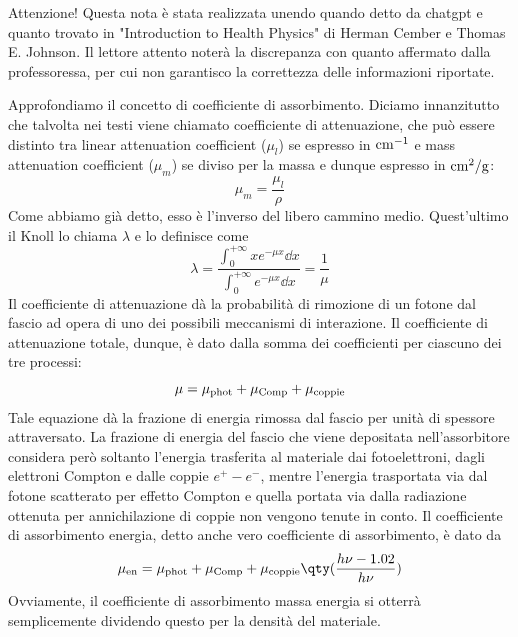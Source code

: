 \begin{approfondimento}
    \footnotesize Attenzione! Questa nota è stata realizzata unendo quando detto da chatgpt e quanto trovato in "Introduction to Health Physics" di Herman Cember e Thomas E. Johnson. Il lettore attento noterà la discrepanza con quanto affermato dalla professoressa, per cui non garantisco la correttezza delle informazioni riportate.
    
    Approfondiamo il concetto di coefficiente di assorbimento. Diciamo innanzitutto che talvolta nei testi viene chiamato coefficiente di attenuazione, che può essere distinto tra linear attenuation coefficient ($\mu_l$) se espresso in $\rm cm^{-1}$ e mass attenuation coefficient ($\mu_m$) se diviso per la massa e dunque espresso in $\rm cm^2/g$:
    \begin{equation*}
        \mu_{m}=\frac{\mu_l}{\rho}
    \end{equation*}
    Come abbiamo già detto, esso è l'inverso del libero cammino medio. Quest'ultimo il Knoll lo chiama $\lambda$ e lo definisce come
    \begin{equation*}
        \lambda
        =\frac{\int_{0}^{+\infty} xe^{-\mu x} \dd{x}}{\int_{0}^{+\infty} e^{-\mu x} \dd{x}}
        =\frac{1}{\mu}
    \end{equation*}
    Il coefficiente di attenuazione dà la probabilità di rimozione di un fotone dal fascio ad opera di uno dei possibili meccanismi di interazione. Il coefficiente di attenuazione totale, dunque, è dato dalla somma dei coefficienti per ciascuno dei tre processi:
    \begin{equation*}
        \mu=\mu_{\rm phot} + \mu_{\rm Comp} + \mu_{\rm coppie}
    \end{equation*}
    Tale equazione dà la frazione di energia rimossa dal fascio per unità di spessore attraversato. La frazione di energia del fascio che viene depositata nell'assorbitore considera però soltanto l'energia trasferita al materiale dai fotoelettroni, dagli elettroni Compton e dalle coppie $e^+ - e^-$, mentre l'energia trasportata via dal fotone scatterato per effetto Compton e quella portata via dalla radiazione ottenuta per annichilazione di coppie non vengono tenute in conto. Il coefficiente di assorbimento energia, detto anche vero coefficiente di assorbimento, è dato da
    \begin{equation*}
        \mu_{\rm en}
        =\mu_{\rm phot} + \mu_{\rm Comp} + \mu_{\rm coppie} \qty( \frac{h \nu - 1.02}{h\nu} )
    \end{equation*}
    Ovviamente, il coefficiente di assorbimento massa energia si otterrà semplicemente dividendo questo per la densità del materiale.


\end{approfondimento}
